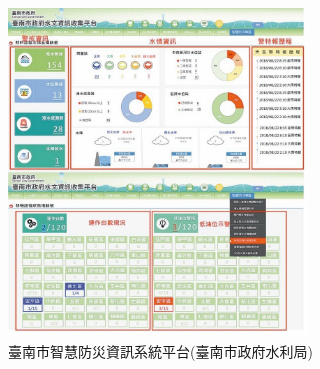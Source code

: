\documentclass[a4paper,12pt]{article}
\begin{document}
\begin{figure}[htbp]
\centering
\includegraphics[width=300]{images/161637280435514_P7767413.jpg}
\caption{\label{fig:FigName}臺南市智慧防災資訊系統平台(臺南市政府水利局)}
\end{figure}
\end{document}
